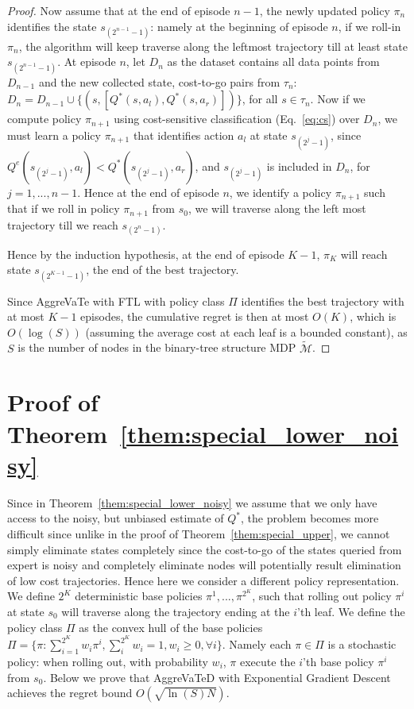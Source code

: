 \documentclass{article}
\begin{document}
\begin{proof}
Now assume that at the end of episode $n-1$, the newly updated policy $\pi_{n}$ identifies the state $s_{(2^{n-1}-1)}$: namely at the beginning of episode $n$, if we roll-in $\pi_n$, the algorithm will keep traverse along the leftmost trajectory till at least state $s_{(2^{n-1}-1)}$. At episode $n$, let $D_n$ as the dataset contains all data points from $D_{n-1}$ and the new collected state, cost-to-go pairs from $\tau_n$: $D_n = D_{n-1}\cup \{(s, [Q^*(s,a_l),Q^*(s,a_r)])\} $, for all $s\in\tau_n$. Now if we compute policy $\pi_{n+1}$ using cost-sensitive classification (Eq.~\ref{eq:cs}) over $D_n$, we must learn a policy $\pi_{n+1}$ that identifies action $a_l$ at state $s_{(2^{j}-1)}$, since $Q^{e}(s_{(2^{j}-1)}, a_l)< Q^*(s_{(2^{j}-1)}, a_r)$, and $s_{(2^j - 1)}$ is included in $D_n$, for $j=1,..., n-1$.  Hence at the end of episode $n$, we identify a policy $\pi_{n+1}$ such that if we roll in policy $\pi_{n+1}$ from $s_0$, we will traverse along the left most trajectory till we reach $s_{(2^n-1)}$.  

Hence by the induction hypothesis, at the end of episode $K-1$, $\pi_{K}$ will reach state $s_{(2^{K-1}-1)}$, the end of the best trajectory.

Since AggreVaTe with FTL with policy class $\Pi$ identifies the best trajectory with at most $K-1$ episodes, the cumulative regret is then at most $O(K)$, which is $O(\log(S))$ (assuming the average cost at each leaf is a bounded constant), as $S$ is the number of nodes in the binary-tree structure MDP $\tilde{\mathcal{M}}$.
\end{proof}


\section{Proof of Theorem~\ref{them:special_lower_noisy}}
\label{sec:proof_special_noisy}
Since in Theorem~\ref{them:special_lower_noisy} we assume that we only have access to the noisy, but unbiased estimate of $Q^*$, the problem becomes more difficult since unlike in the proof of Theorem~\ref{them:special_upper}, we cannot simply eliminate states completely since the cost-to-go of the states queried from expert is noisy and completely eliminate nodes will potentially result elimination of low cost trajectories. Hence here we consider a different policy representation. We define $2^{K}$ deterministic base policies $\pi^1, ..., \pi^{2^K}$, such that rolling out policy $\pi^i$ at state $s_0$ will traverse along the trajectory ending at the $i$'th leaf. We define the policy class $\Pi$ as the convex hull of the base policies $\Pi = \{\pi: \sum_{i=1}^{2^K}w_i\pi^i, \sum_i^{2^K}w_i = 1, w_i\geq 0, \forall i\}$. Namely each $\pi\in\Pi$ is a stochastic policy: when rolling out, with probability $w_i$, $\pi$ execute the $i$'th base policy $\pi^i$ from $s_0$. Below we prove that AggreVaTeD with Exponential Gradient Descent achieves the regret bound $O(\sqrt{\ln(S) N})$.
\end{document}
